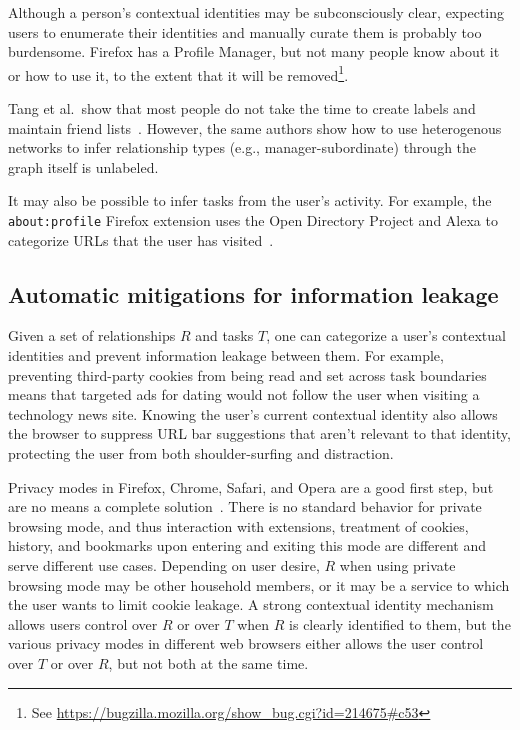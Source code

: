 \documentclass{llncs}
\begin{document}
Although a person's contextual identities may be subconsciously clear,
expecting users to enumerate their identities and manually curate them is
probably too burdensome. Firefox has a Profile Manager, but not many people
know about it or how to use it, to the extent that it will be
removed\footnote{See \url{https://bugzilla.mozilla.org/show\_bug.cgi?id=214675\#c53}}.

Tang et al.~show that most people do not take the time to create labels and
maintain friend lists~\cite{tang}. However, the same authors show how to use
heterogenous networks to infer relationship types (e.g., manager-subordinate)
through the graph itself is unlabeled.

It may also be possible to infer tasks from the user's activity. For example,
the \texttt{about:profile} Firefox extension uses the Open Directory Project
and Alexa to categorize URLs that the user has visited~\cite{aboutprofile}.

\subsection{Automatic mitigations for information leakage}
Given a set of relationships $R$ and tasks $T$, one can categorize a user's
contextual identities and prevent information leakage between them.  For
example, preventing third-party cookies from being read and set across task
boundaries means that targeted ads for dating would not follow the user when
visiting a technology news site. Knowing the user's current contextual identity
also allows the browser to suppress URL bar suggestions that aren't relevant to
that identity, protecting the user from both shoulder-surfing and distraction.

Privacy modes in Firefox, Chrome, Safari, and Opera are a good first step, but
are no means a complete solution~\cite{ABBJ10}. There is no standard behavior
for private browsing mode, and thus interaction with extensions, treatment of
cookies, history, and bookmarks upon entering and exiting this mode are
different and serve different use cases. Depending on user desire, $R$ when
using private browsing mode may be other household members, or it may be a
service to which the user wants to limit cookie leakage. A strong contextual
identity mechanism allows users control over $R$ or over $T$ when $R$ is
clearly identified to them, but the various privacy modes in different web
browsers either allows the user control over $T$ or over $R$, but not both at
the same time.
\end{document}
